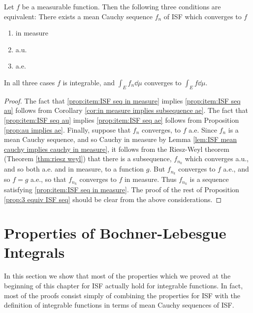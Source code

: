 \begin{proposition}\label{prop:3 equiv ISF seq}
Let $f$ be a measurable function. Then the following three conditions are equivalent: There exists a mean Cauchy sequence $f_n$ of ISF which converges to $f$
\begin{enumerate}[label=\arabic*),ref=\arabic*)]
    \item\label{prop:item:ISF seq in measure}
    in measure
    \item\label{prop:item:ISF seq au}
    a.u.
    \item\label{prop:item:ISF seq ae}
    a.e.
\end{enumerate}
In all three cases $f$ is integrable, and $\int_Ef_n\dd\mu$ converges to $\int_Ef\dd\mu$.
\end{proposition}

\begin{proof}
The fact that \ref{prop:item:ISF seq in measure} implies \ref{prop:item:ISF seq au} follows from Corollary \ref{cor:in measure implies subsequence ae}. The fact that \ref{prop:item:ISF seq au} implies \ref{prop:item:ISF seq ae} follows from Proposition \ref{prop:au implies ae}. Finally, suppose that $f_n$ converges, to $f$ a.e. Since $f_n$ is a mean Cauchy sequence, and so Cauchy in measure by Lemma \ref{lem:ISF mean cauchy implies cauchy in measure}, it follows from the Riesz-Weyl theorem (Theorem \ref{thm:riesz weyl}) that there is a subsequence, $f_{n_k}$ which converges a.u., and so both a.e. and in measure, to a function $g$. But $f_{n_k}$ converges to $f$ a.e., and so $f=g$ a.e., so that $f_{n_k}$ converges to $f$ in measure. Thus $f_{n_k}$ is a sequence satisfying \ref{prop:item:ISF seq in measure}. The proof of the rest of Proposition \ref{prop:3 equiv ISF seq} should be clear from the above considerations.
\end{proof}

\section{Properties of Bochner-Lebesgue Integrals}

In this section we show that most of the properties which we proved at the beginning of this chapter for ISF actually hold for integrable functions. In fact, most of the proofs consist simply of combining the properties for ISF with the definition of integrable functions in terms of mean Cauchy sequences of ISF.

